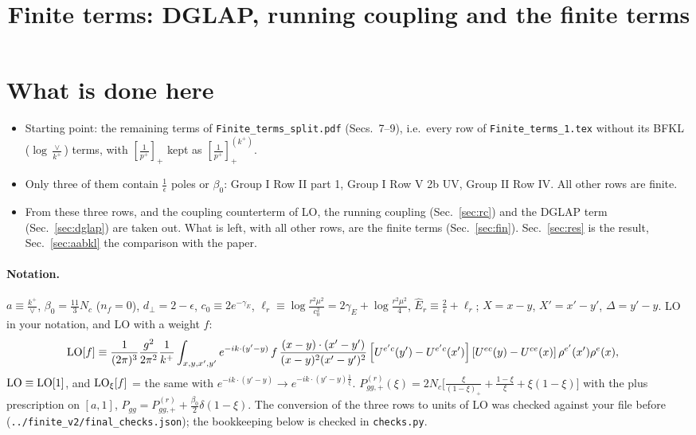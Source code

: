 \documentclass[9pt]{article}
\title{Finite terms: DGLAP, running coupling and the finite terms}
\author{}
\date{}
\numberwithin{equation}{section}
\begin{document}
\maketitle
\sloppy

\section{What is done here}
\begin{itemize}
\item Starting point: the remaining terms of \texttt{Finite\_terms\_split.pdf} (Secs.~7--9), i.e.\ every row of \texttt{Finite\_terms\_1.tex} without its BFKL ($\log\frac{\vee}{k^+}$) terms, with $\left[\frac{1}{p^+}\right]_+$ kept as $\left[\frac{1}{p^+}\right]_+^{(k^+)}$.
\item Only three of them contain $\frac1\epsilon$ poles or $\beta_0$: Group I Row II part 1, Group I Row V 2b UV, Group II Row IV. All other rows are finite.
\item From these three rows, and the coupling counterterm of LO, the running coupling (Sec.~\ref{sec:rc}) and the DGLAP term (Sec.~\ref{sec:dglap}) are taken out. What is left, with all other rows, are the finite terms (Sec.~\ref{sec:fin}). Sec.~\ref{sec:res} is the result, Sec.~\ref{sec:aabkl} the comparison with the paper.
\end{itemize}
\paragraph{Notation.} $a\equiv\frac{k^+}{\vee}$, $\beta_0=\frac{11}{3}N_c$ ($n_f=0$), $d_\perp=2-\epsilon$, $c_0\equiv2e^{-\gamma_E}$, $\ell_r\equiv\log\frac{r^2\mu^2}{c_0^2}=2\gamma_E+\log\frac{r^2\mu^2}{4}$, $\hat E_r\equiv\frac2\epsilon+\ell_r$; $X=x-y$, $X'=x'-y'$, $\Delta=y'-y$. LO in your notation, and LO with a weight $f$:
\begin{align*}
{\rm LO}[f]&\equiv\frac{1}{(2\pi)^{3}}\frac{g^{2}}{2\pi^{2}}\frac{1}{k^{+}}\int_{x,y,x',y'}e^{-ik\cdot(y'-y)}\,f\,\frac{(x-y)\cdot(x'-y')}{(x-y)^{2}(x'-y')^{2}}\left[U^{e'c}(y')-U^{e'c}(x')\right]\left[U^{ec}(y)-U^{ce}(x)\right]\rho^{e'}(x')\rho^{e}(x),
\end{align*}
${\rm LO}\equiv{\rm LO}[1]$, and ${\rm LO}_\xi[f]$ = the same with $e^{-ik\cdot(y'-y)}\to e^{-ik\cdot(y'-y)\frac1\xi}$. $P^{(r)}_{gg,+}(\xi)=2N_c\big[\frac{\xi}{(1-\xi)_+}+\frac{1-\xi}{\xi}+\xi(1-\xi)\big]$ with the plus prescription on $[a,1]$, $P_{gg}=P^{(r)}_{gg,+}+\frac{\beta_0}{2}\delta(1-\xi)$. The conversion of the three rows to units of LO was checked against your file before (\texttt{../finite\_v2/final\_checks.json}); the bookkeeping below is checked in \texttt{checks.py}.
\end{document}

